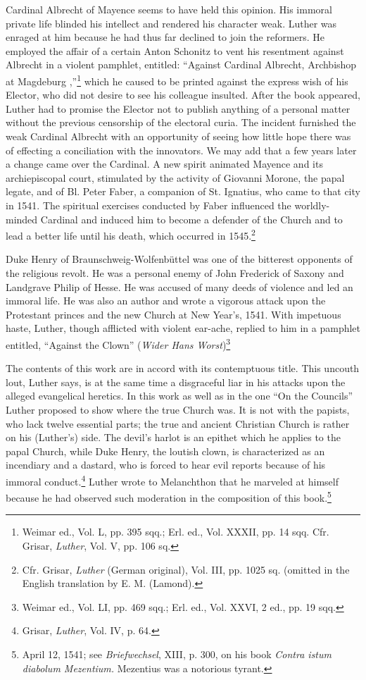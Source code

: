 Cardinal Albrecht of Mayence seems to have held this opinion.
His immoral private life blinded his intellect and rendered his character
weak. Luther was enraged at him because he had thus far declined
to join the reformers. He employed the affair of a certain
Anton Schonitz to vent his resentment against Albrecht in a violent
pamphlet, entitled: “Against Cardinal Albrecht, Archbishop at Magdeburg
,”\footnote
{Weimar ed., Vol. L, pp. 395 sqq.; Erl. ed., Vol. XXXII, pp. 14 sqq. Cfr. Grisar, \textit{Luther},
Vol. V, pp. 106 sq.}
which he caused to be printed against the express wish of
his Elector, who did not desire to see his colleague insulted. After the
book appeared, Luther had to promise the Elector not to publish anything
of a personal matter without the previous censorship of the
electoral curia. The incident furnished the weak Cardinal Albrecht
with an opportunity of seeing how little hope there was of effecting a
conciliation with the innovators. We may add that a few years later
a change came over the Cardinal. A new spirit animated Mayence and
its archiepiscopal court, stimulated by the activity of Giovanni Morone,
the papal legate, and of Bl. Peter Faber, a companion of St.
Ignatius, who came to that city in 1541. The spiritual exercises conducted
by Faber influenced the worldly-minded Cardinal and induced him to become
a defender of the Church and to lead a better
life until his death, which occurred in 1545.\footnote
{Cfr. Grisar, \textit{Luther} (German original), Vol. III, pp. 1025 sq. (omitted in the English
translation by E. M. (Lamond).}

Duke Henry of Braunschweig-Wolfenbüttel was one of the bitterest
opponents of the religious revolt. He was a personal enemy of
John Frederick of Saxony and Landgrave Philip of Hesse. He was
accused of many deeds of violence and led an immoral life. He was
also an author and wrote a vigorous attack upon the Protestant
princes and the new Church at New Year’s, 1541. With impetuous
haste, Luther, though afflicted with violent ear-ache, replied to him
in a pamphlet entitled, “Against the Clown” (\textit{Wider Hans
Worst})\footnote{Weimar ed., Vol. LI, pp. 469 sqq.; Erl. ed., Vol. XXVI, 2 ed.,
pp. 19 sqq.}

The contents of this work are in accord with its contemptuous title.
This uncouth lout, Luther says, is at the same time a disgraceful liar
in his attacks upon the alleged evangelical heretics. In this work as
well as in the one “On the Councils” Luther proposed to show where
the true Church was. It is not with the papists, who lack twelve essential
parts; the true and ancient Christian Church is rather on his
(Luther’s) side. The devil’s harlot is an epithet which he applies to
the papal Church, while Duke Henry, the loutish clown, is characterized
as an incendiary and a dastard, who is forced to hear evil reports
because of his immoral conduct.\footnote{Grisar, \textit{Luther}, Vol. IV, p. 64.}
 Luther wrote to Melanchthon that
he marveled at himself because he had observed such moderation in
the composition of this book.\footnote
{April 12, 1541; see \textit{Briefwechsel}, XIII, p. 300, on his book \textit{Contra istum diabolum Mezentium.}
Mezentius was a notorious tyrant.}

